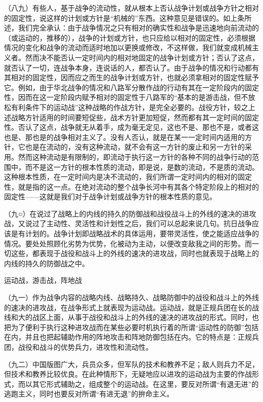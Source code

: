 \documentclass[UTF8, 12pt, a4paper]{ctexrep}
\begin{document}
（八九）有些人，基于战争的流动性，就从根本上否认战争计划或战争方针之相对的固定性，说这样的计划或方针是“机械的”东西。这种意见是错误的。如上条所述，我们完全承认：由于战争情况之只有相对的确实性和战争是迅速地向前流动的（或运动的，推移的），战争的计划或方针，也只应给以相对的固定性，必须根据情况的变化和战争的流动而适时地加以更换或修改，不这样做，我们就变成机械主义者。然而决不能否认一定时间内的相对地固定的战争计划或方针；否认了这点，就否认了一切，连战争本身，连说话的人，都否认了。由于战争的情况和行动都有其相对的固定性，因而应之而生的战争计划或方针，也就必须拿相对的固定性赋予它。例如，由于华北战争的情况和八路军分散作战的行动有其在一定阶段内的固定性，因而在这一定阶段内赋予相对的固定性于八路军的“基本的是游击战，但不放松有利条件下的运动战”这种战略的作战方针，是完全必要的。战役方针，较之上述战略方针适用的时间要短促些，战术方针更加短促，然而都有其一定时间的固定性。否认了这点，战争就无从着手，成为毫无定见，这也不是、那也不是，或者这也是、那也是的战争相对主义了。没有人否认，就是在某一一定时间内适用的方针，它也是在流动的，没有这种流动，就不会有这一方针的废止和另一方针的采用。然而这种流动是有限制的，即流动于执行这一方针的各种不同的战争行动的范围中，而不是这一方针的根本性质的流动，即是说，是数的流动，不是质的流动。这种根本性质，在一定时间内是决不流动的，我们所谓一定时间内的相对的固定性，就是指的这一点。在绝对流动的整个战争长河中有其各个特定阶段上的相对的固定性——这就是我们对于战争计划或战争方针的根本性质的意见。

（九○）在说过了战略上的内线的持久的防御战和战役战斗上的外线的速决的进攻战，又说过了主动性、灵活性和计划性之后，我们可以总起来说几句。抗日战争应该是有计划的。战争计划即战略战术的具体运用，要带灵活性，使之能适应战争的情况。要处处照顾化劣势为优势，化被动为主动，以便改变敌我之间的形势。而一切这些，都表现于战役和战斗上的外线的速决的进攻战，同时也就表现于战略上的内线的持久的防御战之中。

运动战，游击战，阵地战

（九一）作为战争内容的战略内线、战略持久、战略防御中的战役和战斗上的外线的速决的进攻战，在战争形式上就表现为运动战。运动战，就是正规兵团在长的战线和大的战区上面，从事于战役和战斗上的外线的速决的进攻战的形式。同时，也把为了便利于执行这种进攻战而在某些必要时机执行着的所谓“运动性的防御”包括在内，并且也把起辅助作用的阵地攻击和阵地防御包括在内。它的特点是：正规兵团，战役和战斗的优势兵力，进攻性和流动性。

（九二）中国版图广大，兵员众多，但军队的技术和教养不足；敌人则兵力不足，但技术和教养比较优良。在此种情形下，无疑地应以进攻的运动战为主要的作战形式，而以其它形式辅助之，组成整个的运动战。在这里，要反对所谓“有退无进”的逃跑主义，同时也要反对所谓“有进无退”的拚命主义。
\end{document}
